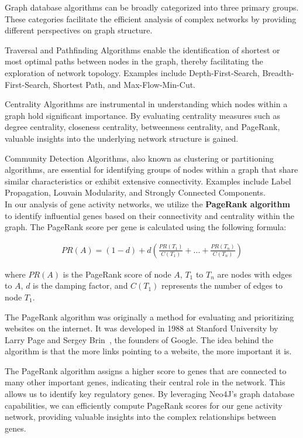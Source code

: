 Graph database algorithms can be broadly categorized into three primary groups.
These categories facilitate the efficient analysis of complex networks
by providing different perspectives on graph structure.

Traversal and Pathfinding Algorithms enable the identification of shortest or
most optimal paths between nodes in the graph, thereby facilitating the exploration of network topology.
Examples include Depth-First-Search, Breadth-First-Search, Shortest Path, and Max-Flow-Min-Cut.

Centrality Algorithms are instrumental in understanding which nodes within a graph hold significant importance.
By evaluating centrality measures such as degree centrality, closeness centrality, betweenness centrality,
and PageRank, valuable insights into the underlying network structure is gained.

Community Detection Algorithms, also known as clustering or partitioning algorithms,
are essential for identifying groups of nodes within a graph that share similar characteristics
or exhibit extensive connectivity.
Examples include Label Propagation, Louvain Modularity, and Strongly Connected Components.
\cite{neo4j_graph_algorithms}\\


In our analysis of gene activity networks,
we utilize the \textbf{PageRank algorithm} to identify influential genes based on their connectivity and
centrality within the graph.
The PageRank score per gene is calculated using the following formula:

\begin{align*}
PR(A)=(1-d)+d(\frac{PR(T_1)}{C(T_1)}+...+\frac{PR(T_n)}{C(T_n)})
\end{align*}

where $PR(A)$ is the PageRank score of node $A$,
$T_1$ to $T_n$ are nodes with edges to $A$,
$d$ is the damping factor,
and $C(T_1)$ represents the number of edges to node $T_1$.

The PageRank algorithm was originally a method for evaluating and prioritizing websites on the internet.
It was developed in 1988 at Stanford University by Larry Page and Sergey Brin~\cite{page1999pagerank},
the founders of Google.
The idea behind the algorithm is that the more links pointing to a website, the more important it is.

The PageRank algorithm assigns a higher score to genes that are connected to many other important genes,
indicating their central role in the network.
This allows us to identify key regulatory genes.
By leveraging Neo4J's graph database capabilities,
we can efficiently compute PageRank scores for our gene activity network,
providing valuable insights into the complex relationships between genes.
